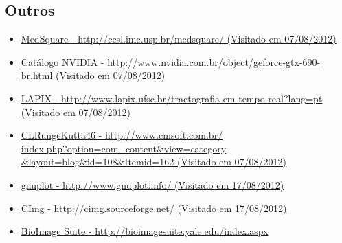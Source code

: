 \subsection{Outros}
\begin{itemize}
  \item \label{medsquare}\href{http://ccsl.ime.usp.br/medsquare/}{MedSquare - http://ccsl.ime.usp.br/medsquare/ (Visitado em 07/08/2012)}
  \item \label{gtx690}\href{http://www.nvidia.com.br/object/geforce-gtx-690-br.html}{Catálogo NVIDIA - http://www.nvidia.com.br/object/geforce-gtx-690-br.html (Visitado em 07/08/2012)}
  \item \label{lapix}\href{http://www.lapix.ufsc.br/tractografia-em-tempo-real?lang=pt}{LAPIX - http://www.lapix.ufsc.br/tractografia-em-tempo-real?lang=pt (Visitado em 07/08/2012)}
  \item \label{CLRungeKutta46}\href{http://www.cmsoft.com.br/index.php?option=com\_content\&view=category\&layout=blog\&id=108\&Itemid=162}{CLRungeKutta46 - http://www.cmsoft.com.br/\\index.php?option=com\_content\&view=category\\ \&layout=blog\&id=108\&Itemid=162 (Visitado em 07/08/2012)}
  \item \label{gnuplot}\href{http://www.gnuplot.info/}{gnuplot - http://www.gnuplot.info/ (Visitado em 17/08/2012)}
  \item \label{CImg}\href{http://cimg.sourceforge.net/}{CImg - http://cimg.sourceforge.net/ (Visitado em 17/08/2012)}
  \item \label{bioimage}\href{http://bioimagesuite.yale.edu/index.aspx}{BioImage Suite - http://bioimagesuite.yale.edu/index.aspx}
\end{itemize}
